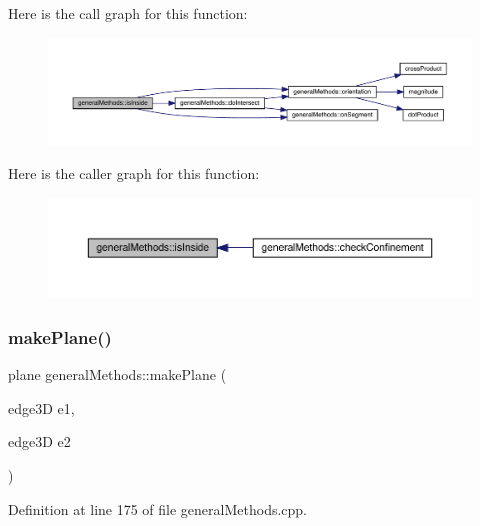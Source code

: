 Here is the call graph for this function\+:
\nopagebreak
\begin{figure}[H]
\begin{center}
\leavevmode
\includegraphics[width=350pt]{namespacegeneral_methods_a27b7ed292415027c495942147e8856b7_cgraph}
\end{center}
\end{figure}
Here is the caller graph for this function\+:
\nopagebreak
\begin{figure}[H]
\begin{center}
\leavevmode
\includegraphics[width=350pt]{namespacegeneral_methods_a27b7ed292415027c495942147e8856b7_icgraph}
\end{center}
\end{figure}
\mbox{\label{namespacegeneral_methods_a06d99f1b292d29dbdbe4734847c8d2ee}} 
\subsubsection{\texorpdfstring{make\+Plane()}{makePlane()}}
{\footnotesize\ttfamily plane general\+Methods\+::make\+Plane (\begin{DoxyParamCaption}\item[{edge3D}]{e1,  }\item[{edge3D}]{e2 }\end{DoxyParamCaption})}



Definition at line 175 of file general\+Methods.\+cpp.

